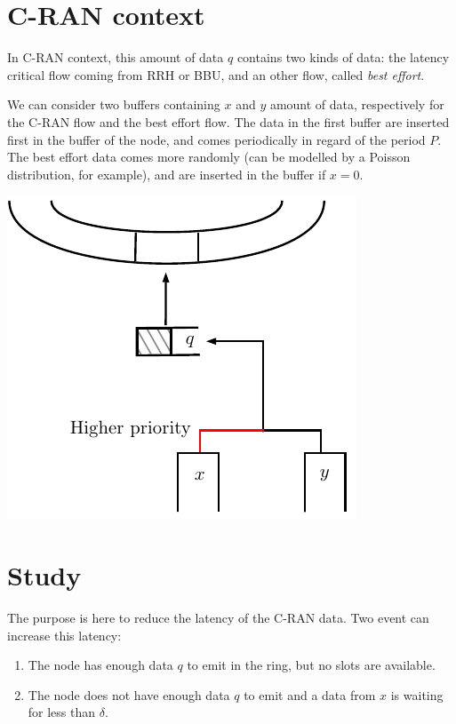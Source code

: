 \documentclass[a4paper,10pt]{article}
\begin{document}
\section{C-RAN context}

In C-RAN context, this amount of data $q$ contains two kinds of data: the latency critical flow coming from RRH or BBU, and an other flow, called {\em best effort}.

We can consider two buffers containing $x$ and $y$ amount of data, respectively for the C-RAN flow and the best effort flow.
The data in the first buffer are inserted first in the buffer of the node, and comes periodically in regard of the period $P$. 
The best effort data comes more randomly (can be modelled by a Poisson distribution, for example), and are inserted in the buffer if $x = 0$.

\begin{center}   

      \includegraphics[scale=0.7]{insertion.pdf}

  
\end{center}

\section*{Study}
The purpose is here to reduce the latency of the C-RAN data. Two event can increase this latency: 
\begin{enumerate}
  \item The node has enough data $q$ to emit in the ring, but no slots are available.
 \item The node does not have enough data $q$ to emit and a data from $x$ is waiting for less than $\delta$.
\end{enumerate}
\end{document}
